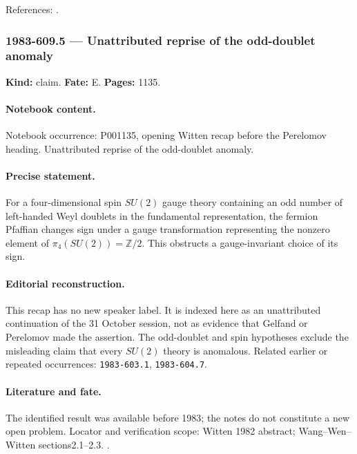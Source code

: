 \noindent References: \citep{andrews1976partitions}.\par

\subsubsection{1983-609.5 --- Unattributed reprise of the odd-doublet anomaly}

\label{item:1983-609.5}

\noindent\textbf{Kind:} claim. \textbf{Fate:} E. \textbf{Pages:} 1135.\par

\paragraph{Notebook content.} Notebook occurrence: P001135, opening Witten recap before the Perelomov heading. Unattributed reprise of the odd-doublet anomaly.

\paragraph{Precise statement.} For a four-dimensional spin \(SU(2)\) gauge theory containing an odd number of left-handed Weyl doublets in the fundamental representation, the fermion Pfaffian changes sign under a gauge transformation representing the nonzero element of \(\pi_4(SU(2))=\mathbb Z/2\). This obstructs a gauge-invariant choice of its sign.

\paragraph{Editorial reconstruction.} This recap has no new speaker label. It is indexed here as an unattributed continuation of the 31 October session, not as evidence that Gelfand or Perelomov made the assertion. The odd-doublet and spin hypotheses exclude the misleading claim that every \(SU(2)\) theory is anomalous. Related earlier or repeated occurrences: \texttt{1983-603.1}, \texttt{1983-604.7}.

\paragraph{Literature and fate.} The identified result was available before 1983; the notes do not constitute a new open problem. Locator and verification scope: Witten 1982 abstract; Wang--Wen--Witten sections2.1--2.3. \cite{witten1982anomaly,wangwenwitten2019new}.

